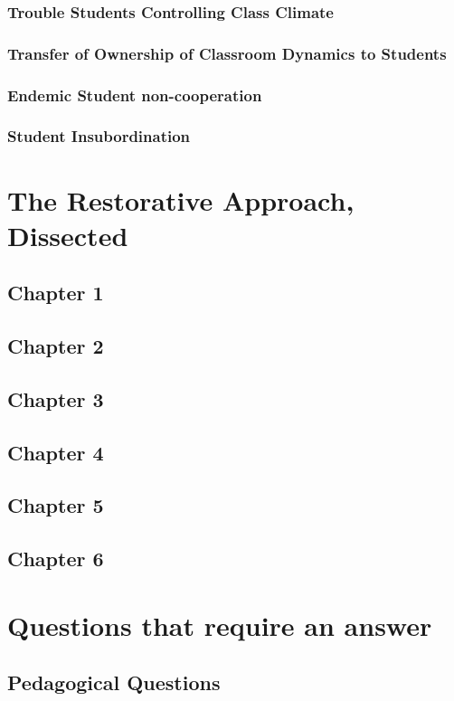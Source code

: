 \documentclass[12pt]{article}
\begin{document}
  \subsubsection{Trouble Students Controlling Class Climate}
  \subsubsection{Transfer of Ownership of Classroom Dynamics to Students}
  \subsubsection{Endemic Student non-cooperation}
  \subsubsection{Student Insubordination}

  \section{The Restorative Approach, Dissected}
  \subsection{Chapter 1}
  \subsection{Chapter 2}
  \subsection{Chapter 3}
  \subsection{Chapter 4}
  \subsection{Chapter 5}
  \subsection{Chapter 6}

  \section{Questions that require an answer}
  \subsection{Pedagogical Questions}
\end{document}

